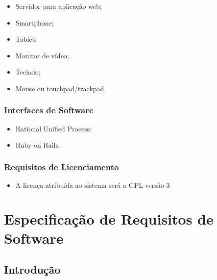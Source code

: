 \begin{itemize}
  \item{Servidor para aplicação web;}
  \item{Smartphone;}
  \item{Tablet;}
  \item{Monitor de vídeo;}
  \item{Teclado;}
  \item{Mouse ou touchpad/trackpad.}
\end{itemize}


\subsection{Interfaces de Software}

\begin{itemize}
  \item{Rational Unified Process;}
  \item{Ruby on Rails.}
\end{itemize}

\subsection{Requisitos de Licenciamento}

\begin{itemize}
  \item{A licença atribuída ao sistema será a GPL versão 3}
\end{itemize}




































\chapter{Especificação de Requisitos de Software}
\label{especificação_de_requisitos_de_software}


\section{Introdução}

